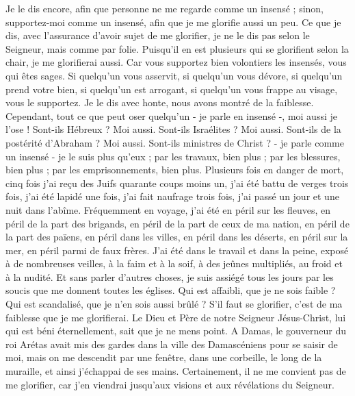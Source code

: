 \begin{multicols}{2}
Je le dis encore, afin que personne ne me regarde comme un insensé ; sinon, supportez-moi comme un insensé, afin que je me glorifie aussi un peu.
Ce que je dis, avec l’assurance d’avoir sujet de me glorifier, je ne le dis pas selon le Seigneur, mais comme par folie.
Puisqu’il en est plusieurs qui se glorifient selon la chair, je me glorifierai aussi.
Car vous supportez bien volontiers les insensés, vous qui êtes sages.
Si quelqu'un vous asservit, si quelqu'un vous dévore, si quelqu'un prend votre bien, si quelqu'un est arrogant, si quelqu'un vous frappe au visage, vous le supportez.
Je le dis avec honte, nous avons montré de la faiblesse. Cependant, tout ce que peut oser quelqu’un - je parle en insensé -, moi aussi je l’ose !
Sont-ils Hébreux ? Moi aussi. Sont-ils Israélites ? Moi aussi. Sont-ils de la postérité d'Abraham ? Moi aussi.
Sont-ils ministres de Christ ? - je parle comme un insensé - je le suis plus qu'eux ; par les travaux, bien plus ; par les blessures, bien plus ; par les emprisonnements, bien plus. Plusieurs fois en danger de mort,
cinq fois j’ai reçu des Juifs quarante coups moins un,
j'ai été battu de verges trois fois, j'ai été lapidé une fois, j'ai fait naufrage trois fois, j'ai passé un jour et une nuit dans l’abîme.
Fréquemment en voyage, j’ai été en péril sur les fleuves, en péril de la part des brigands, en péril de la part de ceux de ma nation, en péril de la part des païens, en péril dans les villes, en péril dans les déserts, en péril sur la mer, en péril parmi de faux frères.
J’ai été dans le travail et dans la peine, exposé à de nombreuses veilles, à la faim et à la soif, à des jeûnes multipliés, au froid et à la nudité.
Et sans parler d’autres choses, je suis assiégé tous les jours par les soucis que me donnent toutes les églises.
Qui est affaibli, que je ne sois faible ? Qui est scandalisé, que je n'en sois aussi brûlé ?
S'il faut se glorifier, c’est de ma faiblesse que je me glorifierai.
Le Dieu et Père de notre Seigneur Jésus-Christ, lui qui est béni éternellement, sait que je ne mens point.
A Damas, le gouverneur du roi Arétas avait mis des gardes dans la ville des Damascéniens pour se saisir de moi,
mais on me descendit par une fenêtre, dans une corbeille, le long de la muraille, et ainsi j'échappai de ses mains.
\VerseOne{}Certainement, il ne me convient pas de me glorifier, car j’en viendrai jusqu’aux visions et aux révélations du Seigneur.

\end{multicols}
